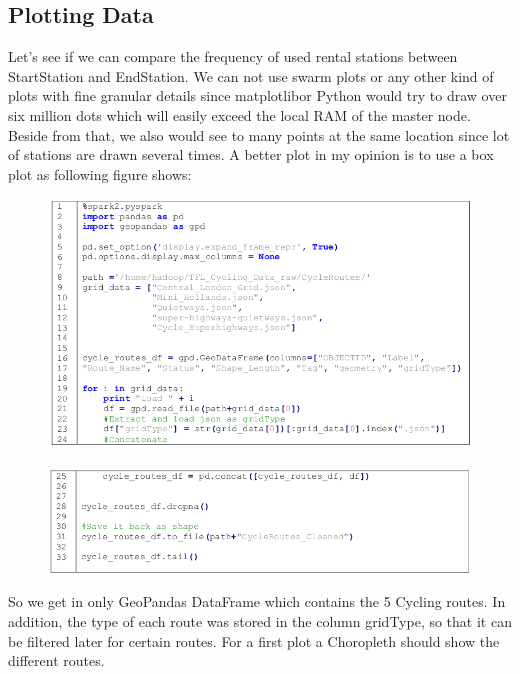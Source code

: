 \documentclass[12pt]{article}
\begin{document}
\subsection{Plotting Data}
Let’s see if we can compare the frequency of used rental stations between StartStation and EndStation.
We can not use swarm plots or any other kind of plots with fine granular details since \glqq matplotlib\grqq or Python would try to draw over six million dots which will easily exceed the local RAM of the master node. Beside from that, we also would see to many points at the same location since lot of stations are drawn several times. A better plot in my opinion is to use a box plot as following figure shows:
\begin{figure}[H]
\hspace{-0.8cm}
\includegraphics[width=1.1\textwidth]{img/spark4}\label{pic:spark4}
\end{figure}
\begin{figure}[H]
\hspace{-0.8cm}
\includegraphics[width=1.1\textwidth]{img/spark5}\label{pic:spark5}
\end{figure}
\noindent So we get in only GeoPandas DataFrame which contains the 5 Cycling routes. In addition, the type of each route was stored in the column \glqq gridType\grqq, so that it can be filtered later for certain routes. For a first plot a Choropleth should show the different routes.
\end{document}
